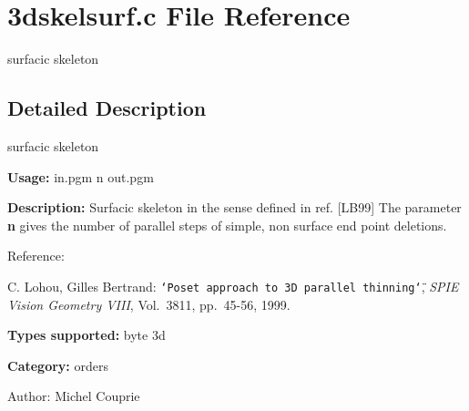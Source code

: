 \section{3dskelsurf.c File Reference}
\label{3dskelsurf_8c}
surfacic skeleton  




\label{_details}
\subsection{Detailed Description}
surfacic skeleton 

{\bf Usage:} in.pgm n out.pgm

{\bf Description:} Surfacic skeleton in the sense defined in ref. [LB99] The parameter {\bf n} gives the number of parallel steps of simple, non surface end point deletions.

Reference:\par
 [LB99] C. Lohou, Gilles Bertrand: {\tt \char`\"{}Poset approach to 3D parallel thinning\char`\"{}}, {\em SPIE Vision Geometry VIII\/}, Vol.~3811, pp.~45-56, 1999.

{\bf Types supported:} byte 3d

{\bf Category:} orders

\begin{Desc}
\item[Author:]Michel Couprie \end{Desc}
